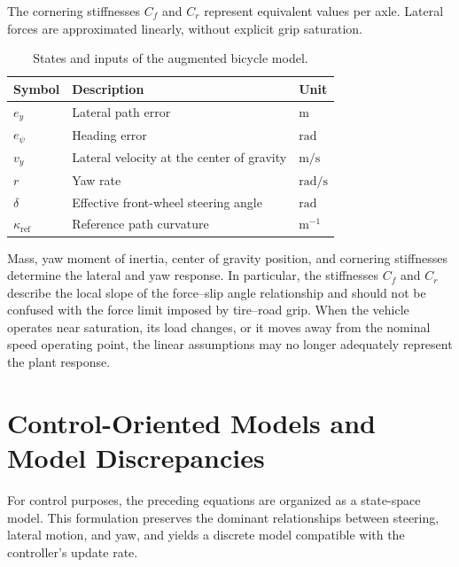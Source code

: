 \documentclass[12pt,a4paper]{report}
\begin{document}
The cornering stiffnesses $C_f$ and $C_r$ represent equivalent values per axle. Lateral forces are approximated linearly, without explicit grip saturation.

\begin{table}[htbp]
    \centering
    \caption{States and inputs of the augmented bicycle model.}
    \label{tab:bicycle_variables}
    \begin{tabular}{@{}lll@{}}
        \toprule
        Symbol & Description & Unit \\
        \midrule
        $e_y$ & Lateral path error & $\mathrm{m}$ \\
        $e_\psi$ & Heading error & $\mathrm{rad}$ \\
        $v_y$ & Lateral velocity at the center of gravity & $\mathrm{m/s}$ \\
        $r$ & Yaw rate & $\mathrm{rad/s}$ \\
        $\delta$ & Effective front-wheel steering angle & $\mathrm{rad}$ \\
        $\kappa_{\mathrm{ref}}$ & Reference path curvature & $\mathrm{m}^{-1}$ \\
        \bottomrule
    \end{tabular}
\end{table}

Mass, yaw moment of inertia, center of gravity position, and cornering stiffnesses determine the lateral and yaw response. In particular, the stiffnesses $C_f$ and $C_r$ describe the local slope of the force--slip angle relationship and should not be confused with the force limit imposed by tire--road grip. When the vehicle operates near saturation, its load changes, or it moves away from the nominal speed operating point, the linear assumptions may no longer adequately represent the plant response.

\section{Control-Oriented Models and Model Discrepancies}
\label{sec:modelos_orientados_control}

For control purposes, the preceding equations are organized as a state-space model. This formulation preserves the dominant relationships between steering, lateral motion, and yaw, and yields a discrete model compatible with the controller's update rate.
\end{document}
